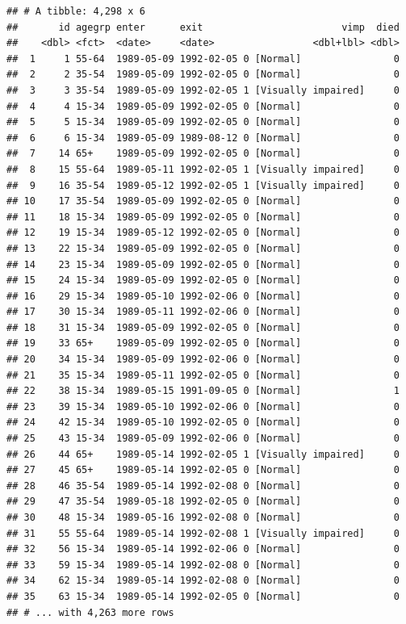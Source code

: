 \documentclass[11pt,]{problemset}
\begin{document}
\begin{verbatim}
## # A tibble: 4,298 x 6
##       id agegrp enter      exit                        vimp  died
##    <dbl> <fct>  <date>     <date>                 <dbl+lbl> <dbl>
##  1     1 55-64  1989-05-09 1992-02-05 0 [Normal]                0
##  2     2 35-54  1989-05-09 1992-02-05 0 [Normal]                0
##  3     3 35-54  1989-05-09 1992-02-05 1 [Visually impaired]     0
##  4     4 15-34  1989-05-09 1992-02-05 0 [Normal]                0
##  5     5 15-34  1989-05-09 1992-02-05 0 [Normal]                0
##  6     6 15-34  1989-05-09 1989-08-12 0 [Normal]                0
##  7    14 65+    1989-05-09 1992-02-05 0 [Normal]                0
##  8    15 55-64  1989-05-11 1992-02-05 1 [Visually impaired]     0
##  9    16 35-54  1989-05-12 1992-02-05 1 [Visually impaired]     0
## 10    17 35-54  1989-05-09 1992-02-05 0 [Normal]                0
## 11    18 15-34  1989-05-09 1992-02-05 0 [Normal]                0
## 12    19 15-34  1989-05-12 1992-02-05 0 [Normal]                0
## 13    22 15-34  1989-05-09 1992-02-05 0 [Normal]                0
## 14    23 15-34  1989-05-09 1992-02-05 0 [Normal]                0
## 15    24 15-34  1989-05-09 1992-02-05 0 [Normal]                0
## 16    29 15-34  1989-05-10 1992-02-06 0 [Normal]                0
## 17    30 15-34  1989-05-11 1992-02-06 0 [Normal]                0
## 18    31 15-34  1989-05-09 1992-02-05 0 [Normal]                0
## 19    33 65+    1989-05-09 1992-02-05 0 [Normal]                0
## 20    34 15-34  1989-05-09 1992-02-06 0 [Normal]                0
## 21    35 15-34  1989-05-11 1992-02-05 0 [Normal]                0
## 22    38 15-34  1989-05-15 1991-09-05 0 [Normal]                1
## 23    39 15-34  1989-05-10 1992-02-06 0 [Normal]                0
## 24    42 15-34  1989-05-10 1992-02-05 0 [Normal]                0
## 25    43 15-34  1989-05-09 1992-02-06 0 [Normal]                0
## 26    44 65+    1989-05-14 1992-02-05 1 [Visually impaired]     0
## 27    45 65+    1989-05-14 1992-02-05 0 [Normal]                0
## 28    46 35-54  1989-05-14 1992-02-08 0 [Normal]                0
## 29    47 35-54  1989-05-18 1992-02-05 0 [Normal]                0
## 30    48 15-34  1989-05-16 1992-02-08 0 [Normal]                0
## 31    55 55-64  1989-05-14 1992-02-08 1 [Visually impaired]     0
## 32    56 15-34  1989-05-14 1992-02-06 0 [Normal]                0
## 33    59 15-34  1989-05-14 1992-02-08 0 [Normal]                0
## 34    62 15-34  1989-05-14 1992-02-08 0 [Normal]                0
## 35    63 15-34  1989-05-14 1992-02-05 0 [Normal]                0
## # ... with 4,263 more rows
\end{verbatim}
\end{document}
